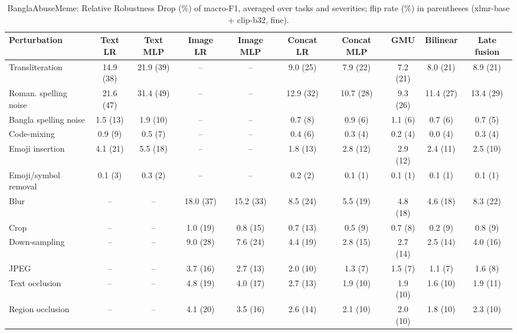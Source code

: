 \begin{table}[t]
\centering
\small
\caption{BanglaAbuseMeme: Relative Robustness Drop (\%) of macro-F1, averaged over tasks and severities; flip rate (\%) in parentheses (xlmr-base + clip-b32, fine).}
\label{tab:rob_fine_banglaabusememe}
\begin{adjustbox}{max width=\textwidth}
\begin{tabular}{lccccccccc}
\toprule
Perturbation & Text LR & Text MLP & Image LR & Image MLP & Concat LR & Concat MLP & GMU & Bilinear & Late fusion \\
\midrule
Transliteration & 14.9 (38) & 21.9 (39) & -- & -- & 9.0 (25) & 7.9 (22) & 7.2 (21) & 8.0 (21) & 8.9 (21) \\
Roman. spelling noise & 21.6 (47) & 31.4 (49) & -- & -- & 12.9 (32) & 10.7 (28) & 9.3 (26) & 11.4 (27) & 13.4 (29) \\
Bangla spelling noise & 1.5 (13) & 1.9 (10) & -- & -- & 0.7 (8) & 0.9 (6) & 1.1 (6) & 0.7 (6) & 0.7 (5) \\
Code-mixing & 0.9 (9) & 0.5 (7) & -- & -- & 0.4 (6) & 0.3 (4) & 0.2 (4) & 0.0 (4) & 0.3 (4) \\
Emoji insertion & 4.1 (21) & 5.5 (18) & -- & -- & 1.8 (13) & 2.8 (12) & 2.9 (12) & 2.4 (11) & 2.5 (10) \\
Emoji/symbol removal & 0.1 (3) & 0.3 (2) & -- & -- & 0.2 (2) & 0.1 (1) & 0.1 (1) & 0.1 (1) & 0.1 (1) \\
Blur & -- & -- & 18.0 (37) & 15.2 (33) & 8.5 (24) & 5.5 (19) & 4.8 (18) & 4.6 (18) & 8.3 (22) \\
Crop & -- & -- & 1.0 (19) & 0.8 (15) & 0.7 (13) & 0.5 (9) & 0.7 (8) & 0.2 (9) & 0.8 (9) \\
Down-sampling & -- & -- & 9.0 (28) & 7.6 (24) & 4.4 (19) & 2.8 (15) & 2.7 (14) & 2.5 (14) & 4.0 (16) \\
JPEG & -- & -- & 3.7 (16) & 2.7 (13) & 2.0 (10) & 1.3 (7) & 1.5 (7) & 1.1 (7) & 1.6 (8) \\
Text occlusion & -- & -- & 4.8 (19) & 4.0 (17) & 2.7 (13) & 1.9 (10) & 1.9 (10) & 1.6 (10) & 1.9 (11) \\
Region occlusion & -- & -- & 4.1 (20) & 3.5 (16) & 2.6 (14) & 2.1 (10) & 2.0 (10) & 1.8 (10) & 2.3 (10) \\
\bottomrule
\end{tabular}
\end{adjustbox}
\end{table}
